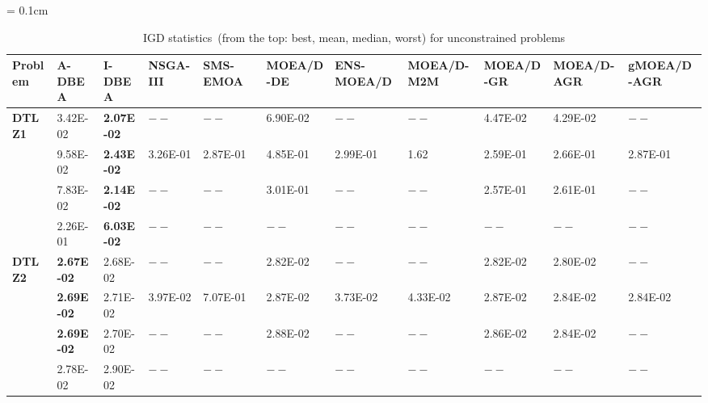 \begin{table*}[!htb]\scriptsize
	\centering
	\caption{IGD statistics~(from the top: best, mean, median, worst) for unconstrained problems}
	\label{tab:IGDunc}
	\tabcolsep = 0.1cm
	\begin{tabular}{|l|l|l|l|l|l|l|l|l|l|l|}
		\noalign{\smallskip}\hline
		\textbf{Problem} & \textbf{A-DBEA}      & \textbf{I-DBEA}         & \textbf{NSGA-III} & \textbf{SMS-EMOA} & \textbf{MOEA/D-DE} & \textbf{ENS-MOEA/D} & \textbf{MOEA/D-M2M} & \textbf{MOEA/D-GR} & \textbf{MOEA/D-AGR} & \textbf{gMOEA/D-AGR} \\ \hline
		\textbf{DTLZ1}   & 3.42E-02 & \textbf{2.07E-02}    & $--$             & $--$              & 6.90E-02           & $--$                & $--$                & 4.47E-02           & 4.29E-02            & $--$                 \\ \cline{2-11} 
		\textbf{}        & 9.58E-02 & \textbf{2.43E-02}    & 3.26E-01         & 2.87E-01          & 4.85E-01           & 2.99E-01            & 1.62                & 2.59E-01           & 2.66E-01            & 2.87E-01             \\ \cline{2-11} 
		\textbf{}        & 7.83E-02 & \textbf{2.14E-02}    & $--$             & $--$              & 3.01E-01           & $--$                & $--$                & 2.57E-01           & 2.61E-01            & $--$                 \\ \cline{2-11} 
		\textbf{}        & 2.26E-01          & \textbf{6.03E-02}    & $--$             & $--$              & $--$               & $--$                & $--$                & $--$               & $--$                & $--$                 \\ \hline
		\textbf{DTLZ2}   & \textbf{2.67E-02} & 2.68E-02    & $--$             & $--$              & 2.82E-02           & $--$                & $--$                & 2.82E-02           & 2.80E-02            & $--$                 \\ \cline{2-11} 
		\textbf{}        & \textbf{2.69E-02} & 2.71E-02    & 3.97E-02         & 7.07E-01          & 2.87E-02           & 3.73E-02            & 4.33E-02            & 2.87E-02           & 2.84E-02            & 2.84E-02             \\ \cline{2-11} 
		\textbf{}        & \textbf{2.69E-02} & 2.70E-02    & $--$             & $--$              & 2.88E-02           & $--$                & $--$                & 2.86E-02           & 2.84E-02            & $--$                 \\ \cline{2-11} 
		\textbf{}        & 2.78E-02          & 2.90E-02    & $--$             & $--$              & $--$               & $--$                & $--$                & $--$               & $--$                & $--$                 \\ \hline

\end{tabular}
\end{table*}

